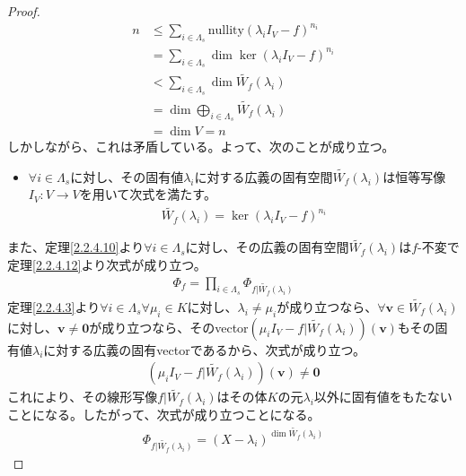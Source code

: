 \documentclass[dvipdfmx]{jsarticle}
\begin{document}
\begin{proof}
\begin{align*}
n &\leq \sum_{i \in \varLambda_{s}} {{\mathrm{nullity}}\left( \lambda_{i}I_{V} - f \right)^{n_{i}}}\\
&= \sum_{i \in \varLambda_{s}} {\dim{\ker\left( \lambda_{i}I_{V} - f \right)^{n_{i}}}}\\
&< \sum_{i \in \varLambda_{s}} {\dim{\widetilde{W_{f}}\left( \lambda_{i} \right)}}\\
&= \dim{\bigoplus_{i \in \varLambda_{s}} {\widetilde{W_{f}}\left( \lambda_{i} \right)}}\\
&= \dim V = n
\end{align*}
しかしながら、これは矛盾している。よって、次のことが成り立つ。
\begin{itemize}
\item
  $\forall i \in \varLambda_{s}$に対し、その固有値$\lambda_{i}$に対する広義の固有空間$\widetilde{W_{f}}\left( \lambda_{i} \right)$は恒等写像$I_{V}:V \rightarrow V$を用いて次式を満たす。
\begin{align*}
\widetilde{W_{f}}\left( \lambda_{i} \right) = \ker\left( \lambda_{i}I_{V} - f \right)^{n_{i}}
\end{align*}\par
\end{itemize}
また、定理\ref{2.2.4.10}より$\forall i \in \varLambda_{s}$に対し、その広義の固有空間$\widetilde{W_{f}}\left( \lambda_{i} \right)$は$f$-不変で定理\ref{2.2.4.12}より次式が成り立つ。
\begin{align*}
\varPhi_{f} = \prod_{i \in \varLambda_{s}} \varPhi_{f|\widetilde{W_{f}}\left( \lambda_{i} \right)}
\end{align*}
定理\ref{2.2.4.3}より$\forall i \in \varLambda_{s}\forall\mu_{i} \in K$に対し、$\lambda_{i} \neq \mu_{i}$が成り立つなら、$\forall\mathbf{v} \in \widetilde{W_{f}}\left( \lambda_{i} \right)$に対し、$\mathbf{v} \neq \mathbf{0}$が成り立つなら、そのvector$\left( \mu_{i}I_{V} - f|\widetilde{W_{f}}\left( \lambda_{i} \right) \right)\left( \mathbf{v} \right)$もその固有値$\lambda_{i}$に対する広義の固有vectorであるから、次式が成り立つ。
\begin{align*}
\left( \mu_{i}I_{V} - f|\widetilde{W_{f}}\left( \lambda_{i} \right) \right)\left( \mathbf{v} \right) \neq \mathbf{0}
\end{align*}
これにより、その線形写像$f|\widetilde{W_{f}}\left( \lambda_{i} \right)$はその体$K$の元$\lambda_{i}$以外に固有値をもたないことになる。したがって、次式が成り立つことになる。
\begin{align*}
\varPhi_{f|\widetilde{W_{f}}\left( \lambda_{i} \right)} = \left( X - \lambda_{i} \right)^{\dim{\widetilde{W_{f}}\left( \lambda_{i} \right)}}

\end{align*}
\end{proof}
\end{document}
